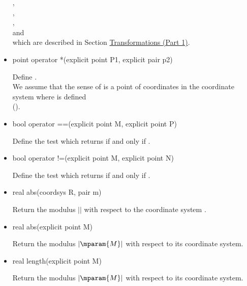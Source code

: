 \documentclass[pdftex]{article}
\begin{document}
\begin{itemize}
  ,\\
  ,\\
  ,\\
   and
  \\
  which are described in Section \href{section.transform1}{Transformations (Part 1)}.
\item {}
  \begin{Vcolor}
    point operator *(explicit point P1, explicit pair p2)
  \end{Vcolor}
  Define .\\
  We assume that the sense of   is a point of 
  coordinates in the coordinate system where  is defined\hfill\\
  ().
\item {}
  \begin{Vcolor}
    bool operator ==(explicit point M, explicit point P)
  \end{Vcolor}
  Define the test   which returns   if and
  only if  .
\item {}
  \begin{Vcolor}
    bool operator !=(explicit point M, explicit point N)
  \end{Vcolor}
  Define the test  which returns  if and only
  if .
\item {}
  \begin{Vcolor}
    real abs(coordsys R, pair m)
  \end{Vcolor}
  Return the modulus $\vert$$\vert$ with respect to the
  coordinate system .
\item {}
  \begin{Vcolor}
    real abs(explicit point M)
  \end{Vcolor}
  Return the modulus  $\vert\mparam{M}\vert$ with respect to its coordinate system.
\item {}
  \begin{Vcolor}
    real length(explicit point M)
  \end{Vcolor}
  Return the modulus  $\vert\mparam{M}\vert$  with respect to its coordinate system.

\end{itemize}
\end{document}
